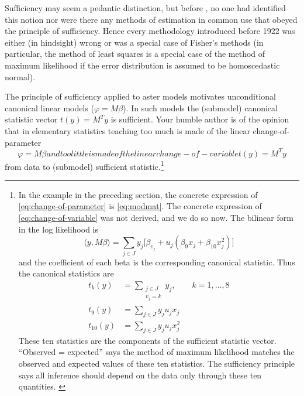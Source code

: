 \documentclass[11pt]{article}
\newcommand{\inner}[1]{\langle #1 \rangle}
\begin{document}
Sufficiency may seem a pedantic distinction, but before \citet{fisher1922},
no one had identified this notion nor were there any methods of estimation
in common use that obeyed the principle of sufficiency.  Hence every
methodology introduced before 1922 was either (in hindsight) wrong or was
a special case of Fisher's methods (in particular, the method of least squares
is a special case of the method of maximum likelihood if the error distribution
is assumed to be homoscedastic normal).

The principle of sufficiency applied to aster models motivates unconditional
canonical linear models ($\varphi = M \beta$).  In such models the (submodel)
canonical statistic vector $t(y) = M^T y$ is sufficient.  Your humble author
is of the opinion that in elementary statistics teaching too much is made
of the linear change-of-parameter
\begin{subequations}
\begin{equation} \label{eq:change-of-parameter}
   \varphi = M \beta
\end{equation}
and too little is made of the linear change-of-variable
\begin{equation} \label{eq:change-of-variable}
   t(y) = M^T y
\end{equation}
\end{subequations}
from data to (submodel) sufficient statistic.\footnote{In the example in the
preceding section, the concrete expression of \eqref{eq:change-of-parameter}
is \eqref{eq:modmat}.  The concrete expression of \eqref{eq:change-of-variable}
was not derived, and we do so now.  The bilinear form in the log likelihood is
$$
   \inner{y, M \beta}
   =
   \sum_{j \in J} y_j \bigl[ \beta_{v_j} + u_j (\beta_9 x_j + \beta_{10} x_j^2)
   \bigr]
$$
and the coefficient of each beta is the corresponding canonical statistic.
Thus the canonical statistics are
\begin{align*}
   t_k(y) & = \sum_{\substack{j \in J \\ v_j = k}} y_j, \qquad k = 1, \ldots, 8
   \\
   t_9(y) & = \sum_{j \in J} y_j u_j x_j
   \\
   t_{10}(y) & = \sum_{j \in J} y_j u_j x_j^2
\end{align*}
These ten statistics are the components of the sufficient statistic vector.
``Observed = expected'' says the method of maximum likelihood matches the
observed and expected values of these ten statistics.  The sufficiency
principle says all inference should depend on the data only through these
ten quantities. \label{foot:land}
}
\end{document}
